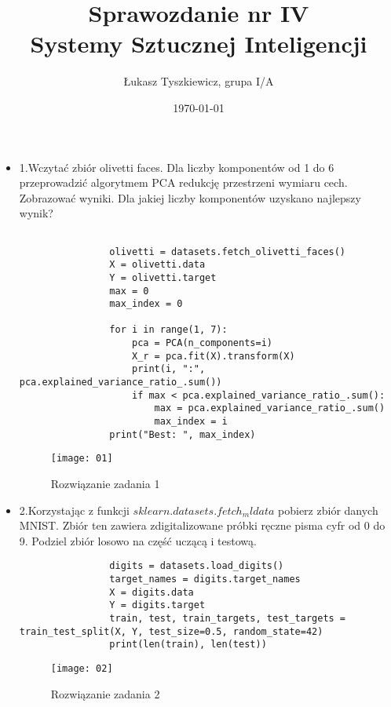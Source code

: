 \documentclass[12pt,a4paper]{article}
\begin{document}
	
	\title{Sprawozdanie nr IV\\Systemy Sztucznej Inteligencji}
	\author{Łukasz Tyszkiewicz, grupa I/A}
	\date{\today}
	
	\maketitle
	\begin{itemize}
		\item 1.Wczytać zbiór olivetti faces. Dla liczby komponentów od 1 do 6 przeprowadzić algorytmem PCA redukcję przestrzeni wymiaru cech. Zobrazować wyniki. Dla jakiej liczby komponentów uzyskano najlepszy wynik?
	\begin{lstlisting}

                olivetti = datasets.fetch_olivetti_faces()
                X = olivetti.data
                Y = olivetti.target
                max = 0
                max_index = 0
                
                for i in range(1, 7):
                    pca = PCA(n_components=i)
                    X_r = pca.fit(X).transform(X)
                    print(i, ":", pca.explained_variance_ratio_.sum())
                    if max < pca.explained_variance_ratio_.sum():
                        max = pca.explained_variance_ratio_.sum()
                        max_index = i
                print("Best: ", max_index)          
	\end{lstlisting}
		\begin{figure}[h]
                        \texttt{[image: 01]}
                        \centering
			\caption{Rozwiązanie zadania 1}
			\label{fig:fig1}
                \end{figure}
                \clearpage 

                \item 2.Korzystając z funkcji $sklearn.datasets.fetch_mldata$ pobierz zbiór danych MNIST. Zbiór ten zawiera zdigitalizowane próbki ręczne pisma cyfr od 0 do 9. Podziel zbiór losowo na część uczącą i testową.
	\begin{lstlisting}
                digits = datasets.load_digits()
                target_names = digits.target_names
                X = digits.data
                Y = digits.target
                train, test, train_targets, test_targets = train_test_split(X, Y, test_size=0.5, random_state=42)
                print(len(train), len(test))
                        \end{lstlisting}
		\begin{figure}[h]
                        \texttt{[image: 02]}
                        \centering
			\caption{Rozwiązanie zadania 2}
			\label{fig:fig2}
                \end{figure}
                \clearpage 


\end{itemize}
\end{document}

